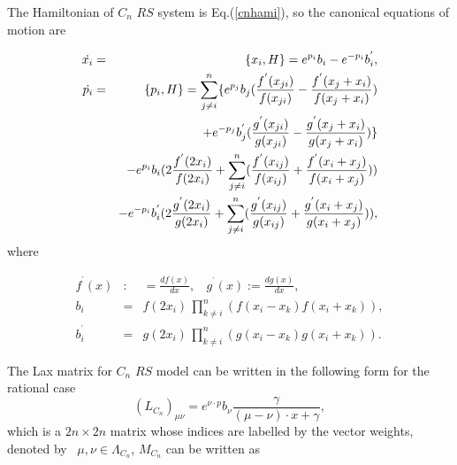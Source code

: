 \documentclass[a4paper,12pt]{article}
\begin{document}
The Hamiltonian of $C_{n}$ $RS$ system is Eq.(\ref{cnhami}), so the canonical
equations of motion are

\begin{eqnarray}
\dot{x_{i}} &=&\{x_{i},H\}=e^{p_{i}}b_{i}-e^{-p_{i}}b_{i}^{^{\prime }},
\label{mocn1} \\
\dot{p_{i}} &=&\{p_{i},H\}=\sum_{j\neq i}^{n}\{e^{p_{j}}b_{j}(\frac{%
f^{^{\prime }}(x_{ji})}{f(x_{ji})}-\frac{f^{^{\prime }}(x_{j}+x_{i})}{%
f(x_{j}+x_{i})})  \nonumber \\
&&+e^{-p_{j}}b_{j}^{^{\prime }}(\frac{g^{^{\prime }}(x_{ji})}{g(x_{ji})}-%
\frac{g^{^{\prime }}(x_{j}+x_{i})}{g(x_{j}+x_{i})})\}  \nonumber \\
&&-e^{p_{i}}b_{i}(2\frac{f^{^{\prime }}(2x_{i})}{f(2x_{i})}+\sum_{j\neq
i}^{n}(\frac{f^{^{\prime }}(x_{ij})}{f(x_{ij})}+\frac{f^{^{\prime
}}(x_{i}+x_{j})}{f(x_{i}+x_{j})}))  \nonumber \\
&&-e^{-p_{i}}b_{i}^{^{\prime }}(2\frac{g^{^{\prime }}(2x_{i})}{g(2x_{i})}%
+\sum_{j\neq i}^{n}(\frac{g^{^{\prime }}(x_{ij})}{g(x_{ij})}+\frac{%
g^{^{\prime }}(x_{i}+x_{j})}{g(x_{i}+x_{j})})),	 \label{mocn2}
\end{eqnarray}
where

\begin{eqnarray}
f^{^{\prime }}(x) &:&=\frac{df(x)}{dx},\ \ \ \ g^{^{\prime }}(x):=\frac{dg(x)%
}{dx},	\nonumber \\
b_{i} &=&f(2x_{i})\,\prod_{k\neq i}^{n}(f(x_{i}-x_{k})f(x_{i}+x_{k})),
\nonumber \\
b_{i}^{^{\prime }} &=&g(2x_{i})\,\prod_{k\neq
i}^{n}(g(x_{i}-x_{k})g(x_{i}+x_{k})).
\end{eqnarray}

\vspace{1pt}The Lax matrix for $C_{n}$ $RS$ model can be written
in the following  form for the rational case
\begin{equation}
(L_{C_{n}})_{\mu \nu }=e^{\nu \cdot p}b_{\nu }\frac{\gamma }{(\mu -\nu
)\cdot x+\gamma },  \label{Lmatrix}
\end{equation}
which is a $2n\times 2n$ matrix whose indices are labelled by the vector
weights, denoted by \ $\mu ,\nu \in \Lambda _{C_{n}}$, $M_{C_{n}}$
can be written as
\end{document}
